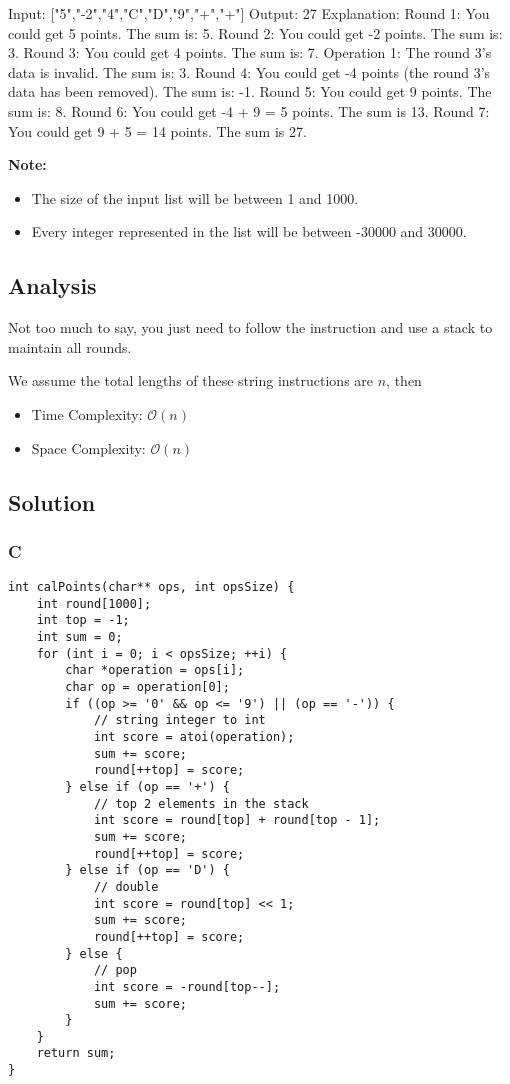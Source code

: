 \begin{example}
\begin{multilinecode}
Input: ["5","-2","4","C","D","9","+","+"]
Output: 27
Explanation:
Round 1: You could get 5 points. The sum is: 5.
Round 2: You could get -2 points. The sum is: 3.
Round 3: You could get 4 points. The sum is: 7.
Operation 1: The round 3's data is invalid. The sum is: 3.  
Round 4: You could get -4 points (the round 3's data has been removed). The sum is: -1.
Round 5: You could get 9 points. The sum is: 8.
Round 6: You could get -4 + 9 = 5 points. The sum is 13.
Round 7: You could get 9 + 5 = 14 points. The sum is 27.
\end{multilinecode}
\end{example}

\textbf{Note:}
\begin{itemize}
\item The size of the input list will be between 1 and 1000.
\item Every integer represented in the list will be between -30000 and 30000.
\end{itemize}

\subsection*{Analysis}
Not too much to say, you just need to follow the instruction and use a stack to maintain all rounds.

We assume the total lengths of these string instructions are $n$, then
\begin{itemize}
\item Time Complexity: $\mathcal{O}(n)$
\item Space Complexity: $\mathcal{O}(n)$
\end{itemize}

\subsection*{Solution}
\subsubsection*{C}
\begin{verbatim}
int calPoints(char** ops, int opsSize) {
    int round[1000];
    int top = -1;
    int sum = 0;
    for (int i = 0; i < opsSize; ++i) {
        char *operation = ops[i];
        char op = operation[0];
        if ((op >= '0' && op <= '9') || (op == '-')) {
            // string integer to int
            int score = atoi(operation);
            sum += score;
            round[++top] = score;
        } else if (op == '+') {
            // top 2 elements in the stack
            int score = round[top] + round[top - 1];
            sum += score;
            round[++top] = score;
        } else if (op == 'D') {
            // double
            int score = round[top] << 1;
            sum += score;
            round[++top] = score;
        } else {
            // pop
            int score = -round[top--];
            sum += score;
        }
    }
    return sum;
}
\end{verbatim}

\newpage

